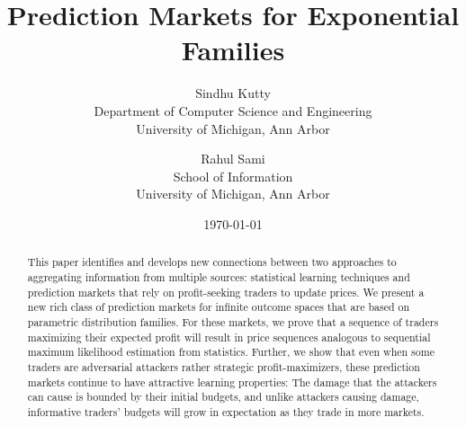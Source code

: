 \documentclass{article}
\begin{document}
%

%
\title{Prediction Markets for Exponential Families}
\author{ Sindhu Kutty\\ Department of Computer Science and Engineering\\University of Michigan, Ann Arbor
\and
Rahul Sami \\School of Information\\University of Michigan, Ann Arbor} 
\date\today
\maketitle
\begin{abstract}
 This paper identifies and develops new connections between two approaches to aggregating information from multiple sources: statistical learning techniques and prediction markets that rely on profit-seeking traders to update prices.
 We present a new rich class of prediction markets for infinite outcome spaces that are based on parametric distribution families. For these markets, we prove that a sequence of traders maximizing their expected profit will result in price sequences analogous to sequential maximum likelihood estimation from statistics. Further, we show that even when some traders are adversarial attackers rather strategic profit-maximizers, these prediction markets continue to have attractive learning properties: The damage that the attackers can cause is bounded by their initial budgets, and unlike attackers causing damage, informative traders' budgets will grow in expectation as they trade in more markets.
\end{abstract}
\end{document}
